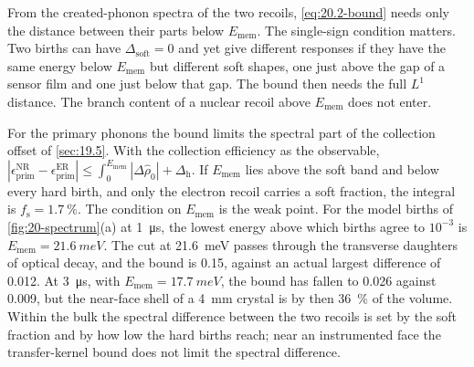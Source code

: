 From the created-phonon spectra of the two recoils, \cref{eq:20.2-bound} needs only the distance between their parts below $E_{\mathrm{mem}}$. The single-sign condition matters. Two births can have $\Delta_{\mathrm{soft}} = 0$ and yet give different responses if they have the same energy below $E_{\mathrm{mem}}$ but different soft shapes, one just above the gap of a sensor film and one just below that gap. The bound then needs the full $L^1$ distance. The branch content of a nuclear recoil above $E_{\mathrm{mem}}$ does not enter.

For the primary phonons the bound limits the spectral part of the collection offset of \cref{sec:19.5}. With the collection efficiency as the observable, $|\epsilon^{\mathrm{NR}}_{\mathrm{prim}} - \epsilon^{\mathrm{ER}}_{\mathrm{prim}}| \le \int_0^{E_{\mathrm{mem}}}|\Delta\hat\rho_0| + \Delta_{\mathrm{h}}$. If $E_{\mathrm{mem}}$ lies above the soft band and below every hard birth, and only the electron recoil carries a soft fraction, the integral is $f_{\mathrm{s}} = \SI{1.7}{\percent}$. The condition on $E_{\mathrm{mem}}$ is the weak point. For the model births of \cref{fig:20-spectrum}(a) at \SI{1}{\micro s}, the lowest energy above which births agree to $10^{-3}$ is $E_{\mathrm{mem}} = \SI{21.6}{meV}$. The cut at \SI{21.6}{meV} passes through the transverse daughters of optical decay, and the bound is 0.15, against an actual largest difference of 0.012. At \SI{3}{\micro s}, with $E_{\mathrm{mem}} = \SI{17.7}{meV}$, the bound has fallen to 0.026 against 0.009, but the near-face shell of a \SI{4}{mm} crystal is by then \SI{36}{\percent} of the volume. Within the bulk the spectral difference between the two recoils is set by the soft fraction and by how low the hard births reach; near an instrumented face the transfer-kernel bound does not limit the spectral difference.
